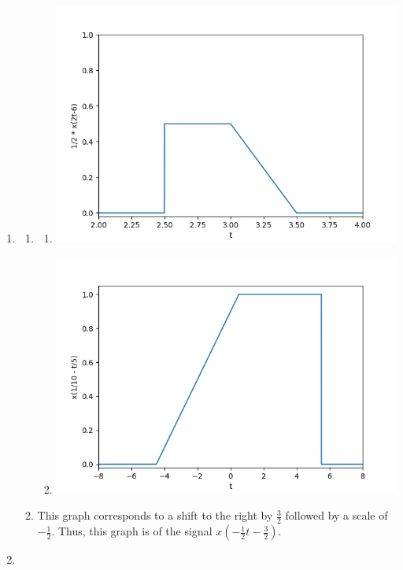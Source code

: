 \documentclass[12pt]{article}
\begin{document}
\begin{enumerate}
      \item \begin{enumerate}
                  \item \begin{enumerate}
                              \item \includegraphics[width=12cm]{img/hw1/i}
                              \item \includegraphics[width=12cm]{img/hw1/ii}
                        \end{enumerate}
                  \item This graph corresponds to a shift to the right by $\frac{3}{2}$
                        followed by a scale of $-\frac{1}{2}$.
                        Thus, this graph is of the signal $\boxed{x\left(-\frac{1}{2}t-\frac{3}{2}\right)}$.
            \end{enumerate}
      \item \begin{enumerate}

\end{enumerate}
\end{enumerate}
\end{document}
